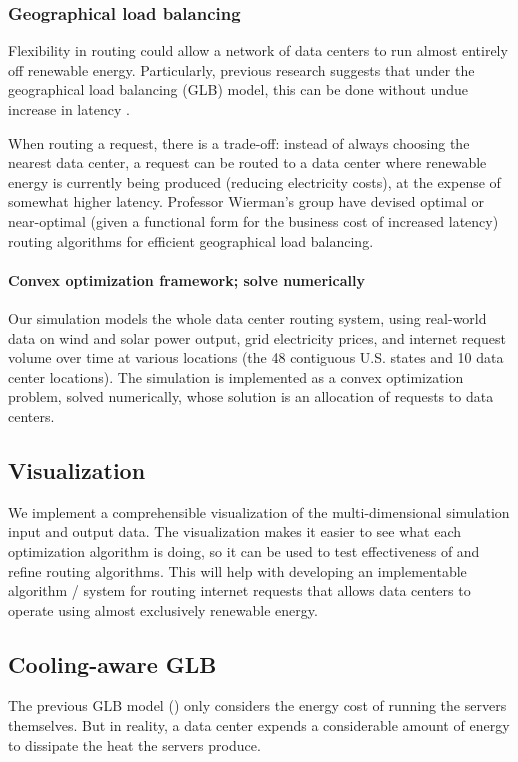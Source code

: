 \documentclass{acm_proc_article-sp}
\begin{document}
	\subsubsection{Geographical load balancing}
		Flexibility in routing could allow a network of data centers to run almost entirely off renewable energy. Particularly, previous research suggests that under the geographical load balancing (GLB) model, this can be done without undue increase in latency \cite{adam:GLB}.
		
		When routing a request, there is a trade-off: instead of always choosing the nearest data center, a request can be routed to a data center where renewable energy is currently being produced (reducing electricity costs), at the expense of somewhat higher latency. Professor Wierman’s group have devised optimal or near-optimal (given a functional form for the business cost of increased latency) routing algorithms for efficient geographical load balancing.
		
		\paragraph{Convex optimization framework; solve numerically}
			Our simulation models the whole data center routing system, using real-world data on wind and solar power output, grid electricity prices, and internet request volume over time at various locations (the 48 contiguous U.S. states and 10 data center locations). The simulation is implemented as a convex optimization problem, solved numerically, whose solution is an allocation of requests to data centers.
		



\subsection{Visualization}
We implement a comprehensible visualization of the multi-dimensional simulation input and output data. The visualization makes it easier to see what each optimization algorithm is doing, so it can be used to test effectiveness of and refine routing algorithms. This will help with developing an implementable algorithm / system for routing internet requests that allows data centers to operate using almost exclusively renewable energy.

\subsection{Cooling-aware GLB}
The previous GLB model (\cite{adam:GLB}) only considers the energy cost of running the servers themselves. But in reality, a data center expends a considerable amount of energy to dissipate the heat the servers produce.
\end{document}
